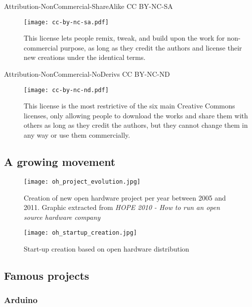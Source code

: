 \begin{description}
    \item[Attribution-NonCommercial-ShareAlike CC BY-NC-SA] \begin{center} \texttt{[image: cc-by-nc-sa.pdf]} \end{center} This license lets people remix, tweak, and build upon the work for non-commercial purpose, as long as they credit the authors and license their new creations under the identical terms.
    \item[Attribution-NonCommercial-NoDerivs CC BY-NC-ND] \begin{center} \texttt{[image: cc-by-nc-nd.pdf]} \end{center} This license is the most restrictive of the six main Creative Commons licenses, only allowing people to download the works and share them with others as long as they credit the authors, but they cannot change them in any way or use them commercially.
\end{description}


\subsection{A growing movement} %



\begin{figure}[H!]
    \begin{center}
        \texttt{[image: oh\_project\_evolution.jpg]}
    \end{center}
    \caption{Creation of new open hardware project per year between 2005 and 2011.
    Graphic extracted from \emph{HOPE 2010 - How to run an open source hardware company}}
    \label{fig:oh_project_evolution}
\end{figure}


\begin{figure}[]
    \begin{center}
        \texttt{[image: oh\_startup\_creation.jpg]}
    \end{center}
    \caption{Start-up creation based on open hardware distribution}
    \label{fig:oh_startup_creation}
\end{figure}

\subsection{Famous projects} %



\subsubsection{Arduino} %

